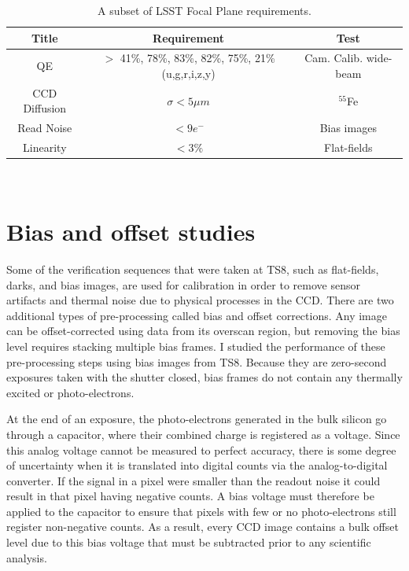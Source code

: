 \begin{table}
\caption{A subset of LSST Focal Plane requirements.}
\label{tab:cam-req}
\centering
\begin{tabular}{|c|c|c|}
  \hline
  Title & Requirement & Test \\
  \hline \hline
  QE & $>$ 41\%, 78\%, 83\%, 82\%, 75\%, 21\% (u,g,r,i,z,y) & Cam. Calib. wide-beam \\
  \hline
  CCD Diffusion & $\sigma < 5\mu m$ & $^{55}$Fe \\
  \hline
  Read Noise & $< 9e^{-}$ & Bias images \\
  \hline
  Linearity & $<3\%$ & Flat-fields\\
  \hline
\end{tabular}
\end{table}\\ 

\section{Bias and offset studies}

Some of the verification sequences that were taken at TS8, such as flat-fields, darks, and bias images, are used for calibration in order to remove sensor artifacts and thermal noise due to physical processes in the CCD. There are two additional types of pre-processing called bias and offset corrections. Any image can be offset-corrected using data from its overscan region, but removing the bias level requires stacking multiple bias frames. I studied the performance of these pre-processing steps using bias images from TS8. Because they are zero-second exposures taken with the shutter closed, bias frames do not contain any thermally excited or photo-electrons. 


At the end of an exposure, the photo-electrons generated in the bulk silicon go through a capacitor, where their combined charge is registered as a voltage. Since this analog voltage cannot be measured to perfect accuracy, there is some degree of uncertainty when it is translated into digital counts via the analog-to-digital converter. If the signal in a pixel were smaller than the readout noise it could result in that pixel having negative counts. A bias voltage must therefore be applied to the capacitor to ensure that pixels with few or no photo-electrons still register non-negative counts. As a result, every CCD image contains a bulk offset level due to this bias voltage that must be subtracted prior to any scientific analysis. 


